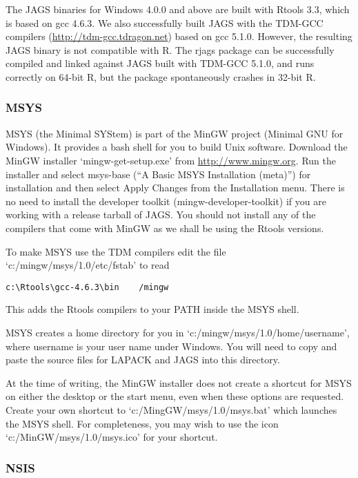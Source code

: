 \documentclass[11pt, a4paper, titlepage]{article}
\newcommand{\JAGS}{\textsf{JAGS}}
\newcommand{\code}[1]{{\bgroup{\normalfont\ttfamily #1}\egroup}}
\newcommand{\file}[1]{{`\normalfont\textsf{#1}'}}
\begin{document}
The JAGS binaries for Windows 4.0.0 and above are built with Rtools
3.3, which is based on gcc 4.6.3. We also successfully built JAGS with
the TDM-GCC compilers (\url{http://tdm-gcc.tdragon.net}) based on gcc
5.1.0. However, the resulting JAGS binary is not compatible with
R. The rjags package can be successfully compiled and linked against
JAGS built with TDM-GCC 5.1.0, and runs correctly on 64-bit R, but
the package spontaneously crashes in 32-bit R.

\subsubsection{MSYS}

MSYS (the Minimal SYStem) is part of the MinGW project (Minimal GNU
for Windows). It provides a bash shell for you to build Unix
software. Download the MinGW installer \file{mingw-get-setup.exe} from
\url{http://www.mingw.org}.  Run the installer and select
\code{msys-base} (``A Basic MSYS Installation (meta)'') for
installation and then select \code{Apply Changes} from the
\code{Installation} menu. There is no need to install the developer
toolkit (\code{mingw-developer-toolkit}) if you are working with a
release tarball of \JAGS.  You should not install any of the compilers
that come with MinGW as we shall be using the Rtools versions.

To make MSYS use the TDM compilers edit the file
\file{c:/mingw/msys/1.0/etc/fstab} to read
\begin{verbatim}
c:\Rtools\gcc-4.6.3\bin    /mingw
\end{verbatim}
This adds the Rtools compilers to your PATH inside the MSYS shell.

MSYS creates a home directory for you in
\file{c:/mingw/msys/1.0/home/username}, where \code{username} is your
user name under Windows. You will need to copy and paste the source
files for LAPACK and JAGS into this directory.

At the time of writing, the MinGW installer does not create a shortcut
for MSYS on either the desktop or the start menu, even when these
options are requested. Create your own shortcut to
\file{c:/MingGW/msys/1.0/msys.bat} which launches the MSYS shell. For
completeness, you may wish to use the icon
\file{c:/MinGW/msys/1.0/msys.ico} for your shortcut.

\subsubsection{NSIS}
\end{document}
